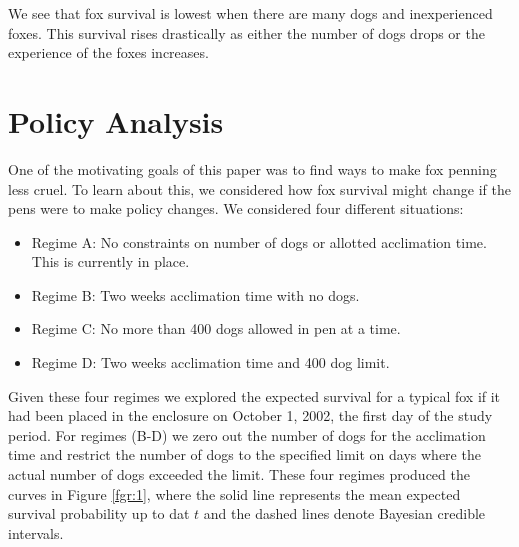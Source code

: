 \documentclass[aoas,preprint]{imsart}
\numberwithin{equation}{section}
\theoremstyle{plain}
\begin{document}
We see that fox survival is lowest when there are many dogs and inexperienced foxes. This survival rises drastically as either the number of dogs drops or the experience of the foxes increases.

\section{Policy Analysis}
One of the motivating goals of this paper was to find ways to make fox penning less cruel. To learn about this, we considered how fox survival might change if the pens were to make policy changes. We considered four different situations:
	\begin{itemize}
		\item Regime A: No constraints on number of dogs or allotted acclimation time. This is currently in place.
		\item Regime B: Two weeks acclimation time with no dogs.
		\item Regime C: No more than 400 dogs allowed in pen at a time.
		\item Regime D: Two weeks acclimation time and 400 dog limit.
	\end{itemize}
Given these four regimes we explored the expected survival for a typical fox if it had been placed in the enclosure on October 1, 2002, the first day of the study period. For regimes (B-D) we zero out the number of dogs for the acclimation time and restrict the number of dogs to the specified limit on days where the actual number of dogs exceeded the limit.
These four regimes produced the curves in Figure \ref{fgr:1}, where the solid line represents the mean expected survival probability up to dat $t$ and the dashed lines denote Bayesian credible intervals.
\end{document}
